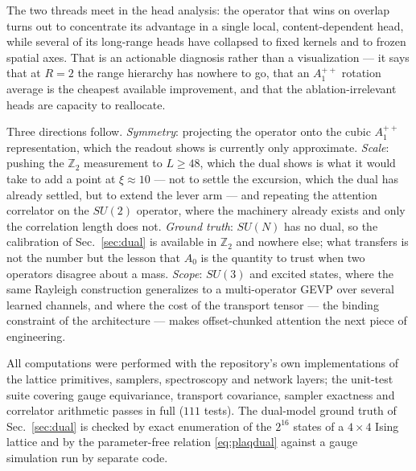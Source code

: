 \documentclass[aps,prl,reprint,superscriptaddress,nofootinbib]{revtex4-2}
\newcommand{\Zt}{\mathbb{Z}_2}
\begin{document}
The two threads meet in the head analysis: the operator that wins on overlap
turns out to concentrate its advantage in a single local, content-dependent
head, while several of its long-range heads have collapsed to fixed kernels and
to frozen spatial axes. That is an actionable diagnosis rather than a
visualization --- it says that at $R=2$ the range hierarchy has nowhere to go,
that an $A_1^{++}$ rotation average is the cheapest available improvement, and
that the ablation-irrelevant heads are capacity to reallocate.

Three directions follow. \emph{Symmetry}: projecting the operator onto the cubic
$A_1^{++}$ representation, which the readout shows is currently only approximate.
\emph{Scale}: pushing the $\Zt$ measurement to $L\ge48$, which the dual shows is
what it would take to add a point at $\xi\approx10$ --- not to settle the
excursion, which the dual has already settled, but to extend the lever arm ---
and repeating the attention correlator on the $SU(2)$ operator, where the
machinery already exists and only the correlation length does not. \emph{Ground
truth}: $SU(N)$ has no dual, so the calibration of Sec.~\ref{sec:dual} is
available in $\Zt$ and nowhere else; what transfers is not the number but the
lesson that $A_0$ is the quantity to trust when two operators disagree about a
mass. \emph{Scope}: $SU(3)$ and excited states, where
the same Rayleigh construction generalizes to a multi-operator GEVP over several
learned channels, and where the cost of the transport tensor --- the binding
constraint of the architecture --- makes offset-chunked attention the next piece
of engineering.

\begin{acknowledgments}
All computations were performed with the repository's own implementations of the
lattice primitives, samplers, spectroscopy and network layers; the unit-test
suite covering gauge equivariance, transport covariance, sampler exactness and
correlator arithmetic passes in full ($111$ tests). The dual-model ground truth
of Sec.~\ref{sec:dual} is checked by exact enumeration of the $2^{16}$ states of
a $4\times4$ Ising lattice and by the parameter-free relation
\eqref{eq:plaqdual} against a gauge simulation run by separate code.
\end{acknowledgments}
\end{document}
